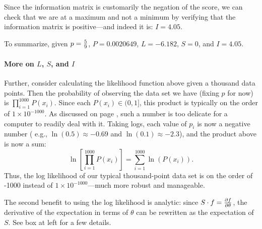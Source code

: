 Since the information matrix is customarily the negation of the score,
we can check that we are at a maximum and not a minimum by verifying
that the information matrix is positive---and indeed it is: $I=4.05$.

To summarize, given $p={5\over 9}$, $P=0.0020649$, $L=-6.182$, $S=0$,
and $I=4.05$.


\paragraph{More on $L$, $S$, and $I$}
\label{precisionfix}
Further, consider calculating the likelihood function above given
a thousand data points.  Then the probability of observing the data set
we have (fixing $p$ for now) is $\prod_{i=1}^{1000} P(x_i)$.  Since each
$P(x_i)\in (0,1]$, this product is typically on the order of $1\times
10^{-1000}$. As discussed on page \pageref{precisionproblem}, such a
number is too delicate for a computer to readily deal with it.
Taking logs, each value of $p_i$ is now a negative
number ( e.g., $\ln(0.5)\approx -0.69$ and $\ln(0.1)\approx -2.3$),  and the
product above is now a sum: $$\ln\left[\prod_{i=1}^{1000} P(x_i)\right]
= \sum_{i=1}^{1000} \ln\left(P(x_i)\right).$$ Thus, the log likelihood of our typical
thousand-point data set is on the order of -1000 instead of $1\times 10^{-1000}$---much
more robust and manageable.

The second benefit to using the log likelihood is analytic: since $S \cdot
f = {\partial f \over \partial \theta}$, the derivative of the expectation
in terms of $\theta$ can be rewritten as the expectation of $S$. See box
at left for a few details.

